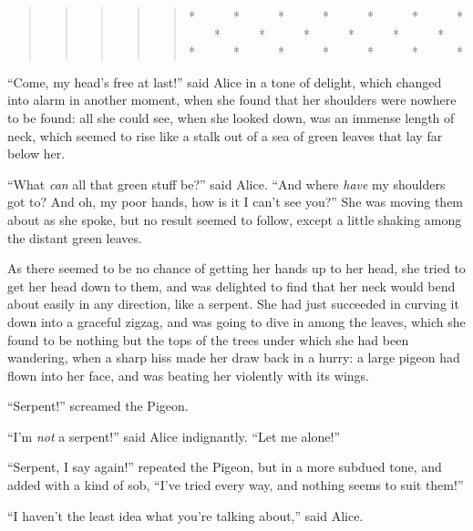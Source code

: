 \documentclass[11pt,openany,oneside]{book}
\begin{document}
\begin{quote}
\begin{quote}
\begin{quote}
\begin{quote}
\begin{quote}
*~~~~~~*~~~~~~*~~~~~~*~~~~~~*~~~~~~*~~~~~~*\newline
 \newline
 ~~~~*~~~~~~*~~~~~~*~~~~~~*~~~~~~*~~~~~~*\newline
 \newline
 *~~~~~~*~~~~~~*~~~~~~*~~~~~~*~~~~~~*~~~~~~*

\end{quote}
\end{quote}
\end{quote}
\end{quote}
\end{quote}
“Come, my head’s free at last!” said Alice in a tone of delight, which changed into alarm in another moment, when she found that her shoulders were nowhere to be found: all she could see, when she looked down, was an immense length of neck, which seemed to rise like a stalk out of a sea of green leaves that lay far below her. 

“What {\em can\/} all that green stuff be?” said Alice. “And where {\em have\/} my shoulders got to? And oh, my poor hands, how is it I can’t see you?” She was moving them about as she spoke, but no result seemed to follow, except a little shaking among the distant green leaves. 

As there seemed to be no chance of getting her hands up to her head, she tried to get her head down to them, and was delighted to find that her neck would bend about easily in any direction, like a serpent. She had just succeeded in curving it down into a graceful zigzag, and was going to dive in among the leaves, which she found to be nothing but the tops of the trees under which she had been wandering, when a sharp hiss made her draw back in a hurry: a large pigeon had flown into her face, and was beating her violently with its wings. 

“Serpent!” screamed the Pigeon. 

“I’m {\em not\/} a serpent!” said Alice indignantly. “Let me alone!” 

“Serpent, I say again!” repeated the Pigeon, but in a more subdued tone, and added with a kind of sob, “I’ve tried every way, and nothing seems to suit them!” 

“I haven’t the least idea what you’re talking about,” said Alice. 
\end{document}
